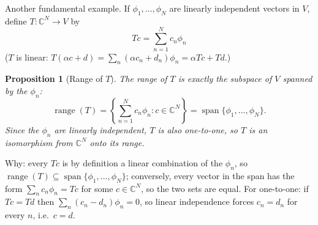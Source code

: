 \documentclass[11pt]{article}
\newcommand{\1}{\mathbf{1}}
\DeclareMathOperator{\Span}{span}
\theoremstyle{notestyle}
\newtheorem{proposition}[theorem]{Proposition}
\theoremstyle{definition}
\begin{document}
Another fundamental example. If $\phi_1, \dots, \phi_N$ are linearly independent
vectors in $V$, define $T : \mathbb{C}^N \rightarrow V$ by
$$Tc = \sum_{n=1}^{N} c_n \phi_n$$
($T$ is linear: $T(\alpha c + d) = \sum_{n}(\alpha c_n + d_n)\phi_n = \alpha Tc + Td$.)
\begin{proposition}[Range of $T$]
\label{prop:range-phi}
The range of $T$ is exactly the subspace of $V$ spanned by the $\phi_n$:
$$\operatorname{range}(T) = \left\{ \sum_{n=1}^{N} c_n \phi_n : c \in \mathbb{C}^N \right\}
= \Span\{\phi_1, \dots, \phi_N\}.$$
Since the $\phi_n$ are linearly independent, $T$ is also one-to-one, so $T$ is an
isomorphism from $\mathbb{C}^N$ onto its range.
\end{proposition}
\par Why: every $Tc$ is by definition a linear combination of the $\phi_n$, so
$\operatorname{range}(T) \subseteq \Span\{\phi_1, \dots, \phi_N\}$; conversely, every
vector in the span has the form $\sum_{n} c_n \phi_n = Tc$ for some $c \in
\mathbb{C}^N$, so the two sets are equal. For one-to-one: if $Tc = Td$ then
$\sum_{n}(c_n - d_n)\phi_n = 0$, so linear independence forces $c_n = d_n$ for every
$n$, i.e.\ $c = d$.
\end{document}
